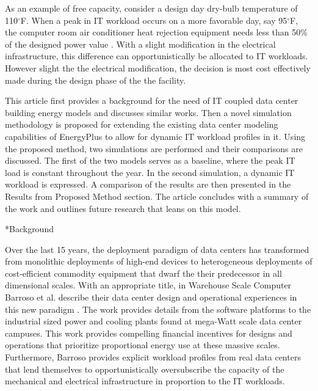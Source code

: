 \documentclass[twocolumn, a4paper,10pt]{article}
\makeatletter
\renewcommand\section{\@startsection{section}{1}{\z@}{0.25cm}{0.1cm}{\normalfont\large\bfseries}}
\makeatother
\begin{document}
As an example of free capacity, consider a design day dry-bulb temperature of 110$^{\circ}$F. When a peak in IT workload occurs on a more favorable day, say 95$^{\circ}$F, the computer room air conditioner heat rejection equipment needs less than 50\% of the designed power value \citep{liebert20}. With a slight modification in the electrical infrastructure, this difference can opportunistically be allocated to IT workloads. However slight the the electrical modification, the decision is most cost effectively made during the design phase of the the facility.

This article first provides a background for the need of IT coupled data center building energy models and discusses similar works. Then a novel simulation methodology is proposed for extending the existing data center modeling capabilities of EnergyPlus to allow for dynamic IT workload profiles in it. Using the proposed method, two simulations are performed and their comparisons are discussed. The first of the two models serves as a baseline, where the peak IT load is constant throughout the year. In the second simulation, a dynamic IT workload is expressed. A comparison of the results are then presented in the Results from Proposed Method section. The article concludes with a summary of the work and outlines future research that leans on this model. 


\section*{Background}

Over the last 15 years, the deployment paradigm of data centers has transformed from monolithic deployments of high-end devices to heterogeneous deployments of cost-efficient commodity equipment that dwarf the their predecessor in all dimensional scales. With an appropriate title, in Warehouse Scale Computer Barroso et al. describe their data center design and operational experiences in this new paradigm \citep{barroso18}. The work provides details from the software platforms to the industrial sized power and cooling plants found at mega-Watt scale data center campuses. This work provides compelling financial incentives for designs and operations that prioritize proportional energy use at these massive scales. Furthermore, Barroso provides explicit workload profiles from real data centers that lend themselves to opportunistically oversubscribe the capacity of the mechanical and electrical infrastructure in proportion to the IT workloads.
\end{document}
